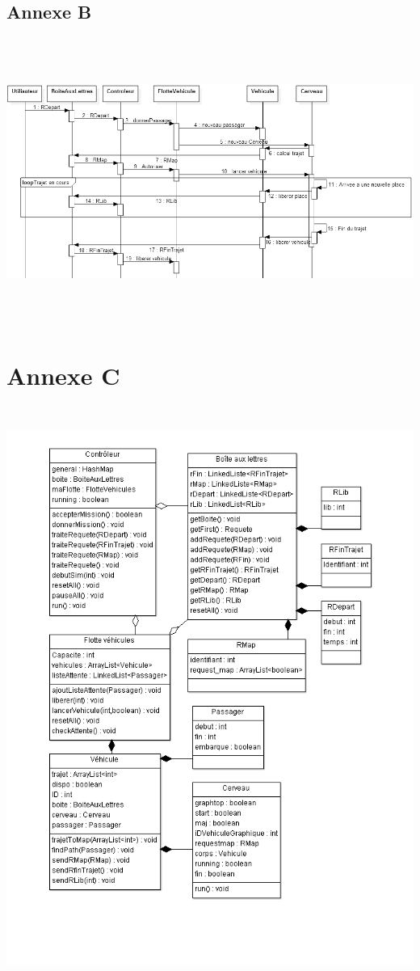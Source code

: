 \documentclass[a4paper, titlepage]{report}
\begin{document}
\setcounter{page}{20}
\begin{landscape}
\vspace{-5cm}
\chapter*{Annexe B}
\includegraphics[width=745px, height=354px]{Images/SequenceDiagram1.png}
\end{landscape}
\setcounter{page}{21}
\chapter*{Annexe C}
\hspace{-2cm}\includegraphics[width=546px, height=718px]{Images/Diagrammedeclasses.png}
\end{document}
